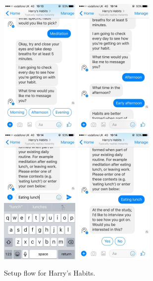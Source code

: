 \begin{figure}[H]
  \newline
  \newline
  \includegraphics[width=1.5in]{resources/design/process/9.jpg}
  \hspace{10px}
  \includegraphics[width=1.5in]{resources/design/process/10.jpg}
  \hspace{10px}
  \includegraphics[width=1.5in]{resources/design/process/11.jpg}
  \hspace{10px}
  \includegraphics[width=1.5in]{resources/design/process/12.jpg}
  \caption{Setup flow for Harry's Habits.}
  \label{fig:setup_flow_screenshots}
\end{figure}



